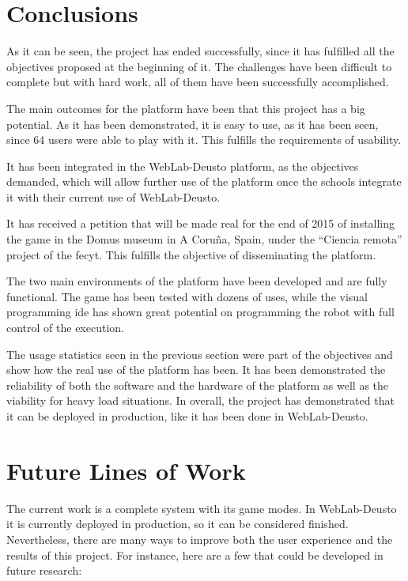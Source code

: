 \section{Conclusions}

As it can be seen, the project has ended successfully, since it has fulfilled all the objectives
proposed at the beginning of it. The challenges have been difficult to complete but with hard work,
all of them have been successfully accomplished.

The main outcomes for the platform have been that this project has a big potential. As it has been
demonstrated, it is easy to use, as it has been seen, since 64 users were able to play with it. This
fulfills the requirements of usability.

It has been integrated in the WebLab-Deusto platform, as the objectives demanded, which will allow
further use of the platform once the schools integrate it with their current use of WebLab-Deusto.

It has received a petition that will be made real for the end of 2015 of installing the game in
the Domus museum in A Coruña, Spain, under the ``Ciencia remota'' project of the \acrshort{fecyt}.
This fulfills the objective of disseminating the platform.

The two main environments of the platform have been developed and are fully functional. The game has
been tested with dozens of uses, while the visual programming \acrshort{ide} has shown great
potential on programming the robot with full control of the execution.

The usage statistics seen in the previous section were part of the objectives and show how the real
use of the platform has been. It has been demonstrated the reliability of both the software and the
hardware of the platform as well as the viability for heavy load situations. In overall, the project
has demonstrated that it can be deployed in production, like it has been done in WebLab-Deusto.

\section{Future Lines of Work}

The current work is a complete system with its game modes. In WebLab-Deusto it is currently deployed
in production, so it can be considered finished. Nevertheless, there are many ways to improve both
the user experience and the results of this project. For instance, here are a few that could be
developed in future research:

